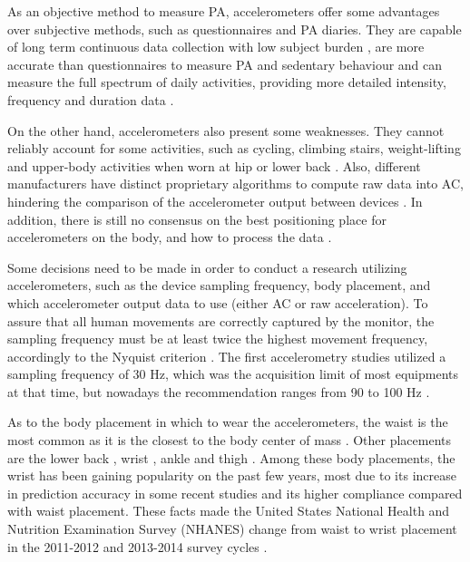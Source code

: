 \documentclass[12pt]{article}
\begin{document}
As an objective method to measure PA, accelerometers offer some advantages over subjective methods, such as questionnaires and PA diaries. They are capable of long term continuous data collection with low subject burden , are more accurate than questionnaires to measure PA and sedentary behaviour  and can measure the full spectrum of daily activities, providing more detailed intensity, frequency and duration data .

On the other hand, accelerometers also present some weaknesses. They cannot reliably account for some activities, such as cycling, climbing stairs, weight-lifting and upper-body activities when worn at hip or lower back . Also, different manufacturers have distinct proprietary algorithms to compute raw data into AC, hindering the comparison of the accelerometer output between devices . In addition, there is still no consensus on the best positioning place for accelerometers on the body, and how to process the data .

Some decisions need to be made in order to conduct a research utilizing accelerometers, such as the device sampling frequency, body placement, and which accelerometer output data to use (either AC or raw acceleration). To assure that all human movements are correctly captured by the monitor, the sampling frequency must be at least twice the highest movement frequency, accordingly to the Nyquist criterion . The first accelerometry studies utilized a sampling frequency of 30 Hz, which was the acquisition limit of most equipments at that time, but nowadays the recommendation ranges from 90 to 100 Hz .

As to the body placement in which to wear the accelerometers, the waist is the most common as it is the closest to the body center of mass . Other placements are the lower back , wrist , ankle  and thigh . Among these body placements, the wrist has been gaining popularity on the past few years, most due to its increase in prediction accuracy in some recent studies  and its higher compliance compared with waist placement. These facts made the United States National Health and Nutrition Examination Survey (NHANES) change from waist to wrist placement in the 2011-2012 and 2013-2014 survey cycles .
\end{document}
